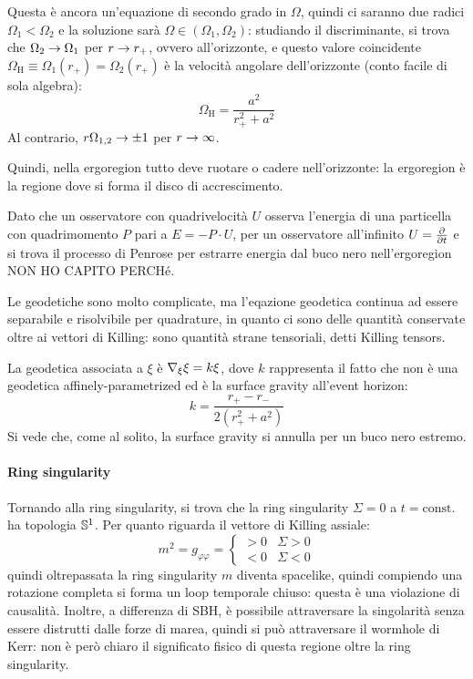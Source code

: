 Questa è ancora un'equazione di secondo grado in $ \Omega $, quindi ci saranno due radici $ \Omega_1 < \Omega_2 $ e la soluzione sarà $ \Omega \in (\Omega_1 , \Omega_2) $: studiando il discriminante, si trova che $ \Omega_2 \rightarrow \Omega_1 $ per $ r \rightarrow r_+ $, ovvero all'orizzonte, e questo valore coincidente $ \Omega_\text{H} \equiv \Omega_1(r_+) = \Omega_2(r_+) $ è la velocità angolare dell'orizzonte (conto facile di sola algebra):
\begin{equation}
  \Omega_\text{H} = \frac{a^2}{r_+^2 + a^2}
\end{equation}
Al contrario, $ r \Omega_{1,2} \rightarrow \pm 1 $ per $ r \rightarrow \infty $.

Quindi, nella ergoregion tutto deve ruotare o cadere nell'orizzonte: la ergoregion è la regione dove si forma il disco di accrescimento.

Dato che un osservatore con quadrivelocità $ U $ osserva l'energia di una particella con quadrimomento $ P $ pari a $ E = - P \cdot U $, per un osservatore all'infinito $ U = \frac{\partial}{\partial t} $ e si trova il processo di Penrose per estrarre energia dal buco nero nell'ergoregion NON HO CAPITO PERCHé.

Le geodetiche sono molto complicate, ma l'eqazione geodetica continua ad essere separabile e risolvibile per quadrature, in quanto ci sono delle quantità conservate oltre ai vettori di Killing: sono quantità strane tensoriali, detti Killing tensors.

La geodetica associata a $ \xi $ è $ \nabla_\xi \xi = k \xi $, dove $ k $ rappresenta il fatto che non è una geodetica affinely-parametrized ed è la surface gravity all'event horizon:
\begin{equation}
  k = \frac{r_+ - r_-}{2 (r_+^2 + a^2)}
\end{equation}
Si vede che, come al solito, la surface gravity si annulla per un buco nero estremo.

\paragraph{Ring singularity}

Tornando alla ring singularity, si trova che la ring singularity $ \Sigma = 0 $ a $ t = \text{const.} $ ha topologia $ \mathbb{S}^{1} $. Per quanto riguarda il vettore di Killing assiale:
\begin{equation*}
  m^2 = g_{\varphi \varphi} =
  \begin{cases}
    > 0 & \Sigma > 0 \\
    < 0 & \Sigma < 0
  \end{cases}
\end{equation*}
quindi oltrepassata la ring singularity $ m $ diventa spacelike, quindi compiendo una rotazione completa si forma un loop temporale chiuso: questa è una violazione di causalità. Inoltre, a differenza di SBH, è possibile attraversare la singolarità senza essere distrutti dalle forze di marea, quindi si può attraversare il wormhole di Kerr: non è però chiaro il significato fisico di questa regione oltre la ring singularity.

